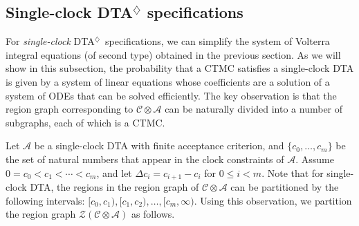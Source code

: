 \documentclass{LMCS}
\newcommand{\mc}[1]{\mathcal{#1}}
\newcommand{\<}{\langle}
\renewcommand{\>}{\rangle}
\newcommand{\les}{\leqslant}
\newcommand{\mC}{\mathcal{C}}
\newcommand{\mA}{\mathcal{A}}
\newcommand{\DTA}{\textsc{DTA}}
\newcommand{\DTAr}{\DTA$^{\!\Ever}$}
\newcommand{\ODE}{\textsc{ODE}}
\newcommand{\F}{\mathop{\diamondsuit}}
\newcommand{\Ever}{\F}
\begin{document}
\subsection{Single-clock \texorpdfstring{\DTAr}{DTAdiamond} specifications}\label{sec:singleDTA}

For \emph{single-clock} \DTAr\ specifications, we can simplify the system of Volterra integral
equations (of second type) obtained in the previous section.
As we will show in this subsection, the probability that a CTMC satisfies a single-clock DTA is
given by a system of linear equations whose coefficients are a solution of a system of \ODE s
that can be solved efficiently.
The key observation is that the region graph corresponding to $\mC \otimes \mA$ can be
naturally divided into a number of subgraphs, each of which is a CTMC.

Let $\mA$ be a single-clock DTA with finite acceptance criterion, and $\{c_0, \ldots, c_m\}$
be the set of natural numbers that appear in the clock constraints of $\mA$.
Assume $0=c_0< c_1<\cdots< c_m$, and let $\Delta c_i = c_{i{+}1} - c_i$ for $0 \les i <m$.
Note that for single-clock \DTA, the regions in the region graph of $\mC \otimes \mA$ can
be partitioned by the following intervals: $[c_0,c_1), [c_1, c_2), \ldots, [c_m,\infty)$.
Using this observation, we partition the region graph $\mc{Z}(\mc{C} \otimes \mc{A})$ as
follows.
\end{document}
